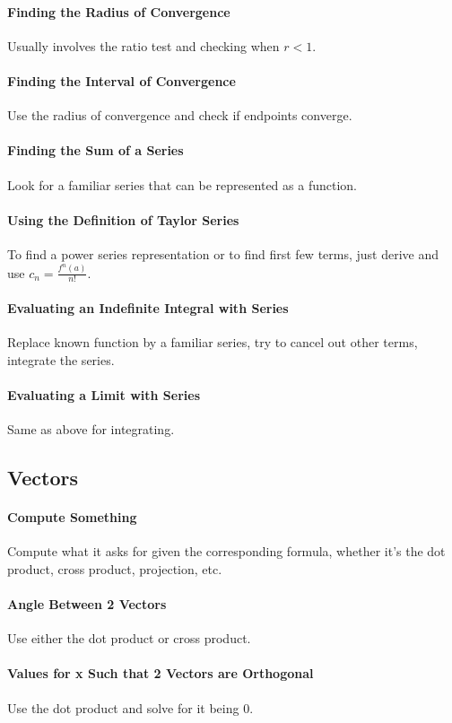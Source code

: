 \documentclass[12 pt]{article}
\theoremstyle{definition}
\begin{document}
\paragraph{Finding the Radius of Convergence} Usually involves the ratio test and checking when $r<1$.
\paragraph{Finding the Interval of Convergence} Use the radius of convergence and check if endpoints converge.
\paragraph{Finding the Sum of a Series} Look for a familiar series that can be represented as a function.
\paragraph{Using the Definition of Taylor Series} To find a power series representation or to find first few terms, just derive and use $c_n=\frac{f^{n}(a)}{n!}$.
\paragraph{Evaluating an Indefinite Integral with Series} Replace known function by a familiar series, try to cancel out other terms, integrate the series.
\paragraph{Evaluating a Limit with Series} Same as above for integrating.
\subsection{Vectors}
\paragraph{Compute Something} Compute what it asks for given the corresponding formula, whether it's the dot product, cross product, projection, etc.
\paragraph{Angle Between 2 Vectors} Use either the dot product or cross product.
\paragraph{Values for x Such that 2 Vectors are Orthogonal} Use the dot product and solve for it being $0$.
\end{document}
